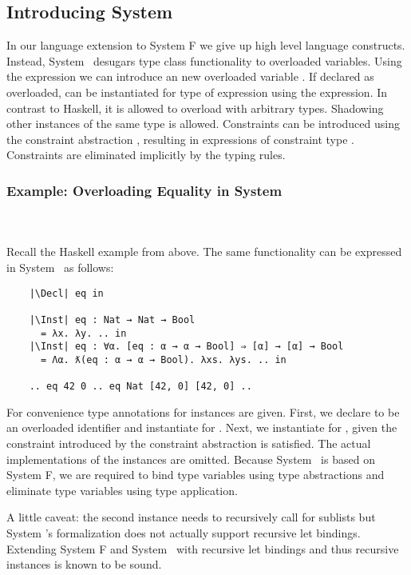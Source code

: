 \subsection{Introducing System \Fo}
In our language extension to System F we give up high level language constructs. 
Instead, System \Fo\ desugars type class functionality to overloaded variables. 
Using the  expression we can introduce an new overloaded variable . 
If declared as overloaded,  can be instantiated for type  of expression  using the  expression.
In contrast to Haskell, it is allowed to overload  with arbitrary types. 
Shadowing other instances of the same type is allowed.
Constraints can be introduced using the constraint abstraction , resulting in expressions of constraint type . 
Constraints are eliminated implicitly by the typing rules.

\subsubsection{Example: Overloading Equality in System \Fo}\hfill\\\\
Recall the Haskell example from above. The same functionality can be expressed in System \Fo\ as follows: 
\begin{verbatim}
    |\Decl| eq in

    |\Inst| eq : Nat → Nat → Bool 
      = λx. λy. .. in
    |\Inst| eq : ∀α. [eq : α → α → Bool] ⇒ [α] → [α] → Bool 
      = Λα. ƛ(eq : α → α → Bool). λxs. λys. .. in

    .. eq 42 0 .. eq Nat [42, 0] [42, 0] .. 
\end{verbatim}
For convenience type annotations for instances are given. 
First, we declare  to be an overloaded identifier and instantiate  for . 
Next, we instantiate  for \inl{[α]}, given the constraint introduced by the constraint abstraction  is satisfied.  
The actual implementations of the instances are omitted.
Because System \Fo\ is based on System F, we are required to bind type variables using type abstractions  and eliminate type variables using type application. 

\noindent A little caveat: the second instance needs to recursively call  for sublists but System \Fo's formalization does not actually support recursive let bindings. Extending System F and System \Fo\ with recursive let bindings and thus recursive instances is known to be sound. 

